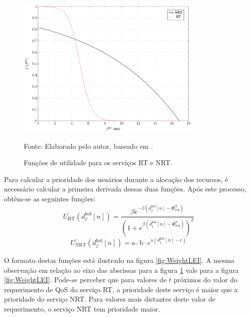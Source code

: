 \begin{figure}[ht]
	\centering	
	
	\caption[Funções de utilidade para os serviços RT e NRT]{Funções de utilidade para os serviços RT e NRT.}
	\includegraphics[width=0.8\textwidth]{figs/PrimitiveWeightLEIOriginal.pdf}
	
	{Fonte: Elaborado pelo autor, baseado em \cite{Proc:Lei2007}.}
	\label{fig:PrimitiveWeightLEI}
\end{figure} 

Para calcular a prioridade dos usuários durante a alocação dos recursos, é necessário calcular a primeira derivada dessas duas funções. Após este processo, obtêm-se as seguintes funções:
%
\begin{equation}
\label{Eq:LeiMarginalRT}
U^{'}_{\text{RT}}(d_{j}^{\text{hol}}[n]) =	\dfrac{ \beta  e^{-\beta (d_{j}^{\text{hol}}[n] - \Phi_{\text{req}}^{\text{rt}})}}{\left(1 + e^{\beta (d_{j}^{\text{hol}}[n] - \Phi_{\text{req}}^{\text{rt}})}\right)^{2}}
\end{equation}
%
\begin{equation}
U^{'}_{\text{NRT}}(d_{j}^{\text{hol}}[n]) = 	\text{a}\cdot \text{b}\cdot e^{\text{a}(d_{j}^{\text{hol}}[n]- c)}
\end{equation}

O formato destas funções está ilustrado na figura \ref{fig:WeightLEI}. A mesma observação em relação ao eixo das abscissas para a figura \ref{fig:PrimitiveWeightLEI} vale para a figura \ref{fig:WeightLEI}. Pode-se perceber que para valores de $t$ próximos do valor do requerimento de QoS do serviço RT, a prioridade deste serviço é maior que a prioridade do serviço NRT. Para valores mais distantes deste valor de requerimento, o serviço NRT tem prioridade maior.

